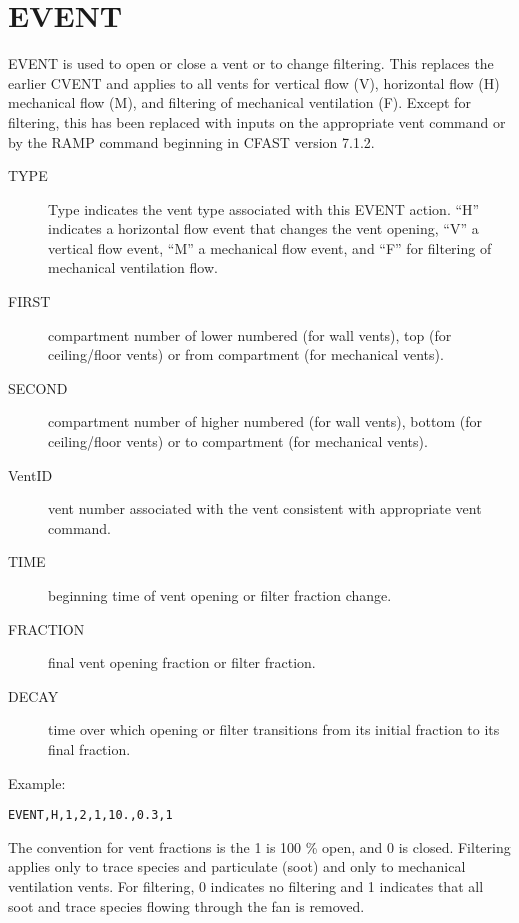 \section{EVENT}

EVENT is used to open or close a vent or to change filtering. This replaces the earlier CVENT and applies to all vents for vertical flow (V), horizontal flow (H) mechanical flow (M), and filtering of mechanical ventilation (F). Except for filtering, this has been replaced with inputs on the appropriate vent command or by the RAMP command beginning in CFAST version 7.1.2.

\begin{adjustwidth}{1cm}{0cm}
\begin{description}
  \item[TYPE] Type indicates the vent type associated with this EVENT action. ``H'' indicates a horizontal flow event that changes the vent opening, ``V'' a vertical flow event, ``M'' a mechanical flow event, and ``F'' for filtering of mechanical ventilation flow.
  \item[FIRST] compartment number of lower numbered (for wall vents), top (for ceiling/floor vents) or from compartment (for mechanical vents).
  \item[SECOND] compartment number of higher numbered (for wall vents), bottom (for ceiling/floor vents) or to compartment (for mechanical vents).
  \item[VentID] vent number associated with the vent consistent with appropriate vent command.
  \item[TIME] beginning time of vent opening or filter fraction change.
  \item[FRACTION] final vent opening fraction or filter fraction.
  \item[DECAY] time over which opening or filter transitions from its initial fraction to its final fraction.
\end{description}
\end{adjustwidth}

\noindent Example:

\begin{lstlisting}
EVENT,H,1,2,1,10.,0.3,1
\end{lstlisting}

The convention for vent fractions is the 1 is 100 \% open, and 0 is closed. Filtering applies only to trace species and particulate (soot) and only to mechanical ventilation vents. For filtering, 0 indicates no filtering and 1 indicates that all soot and trace species flowing through the fan is removed.

